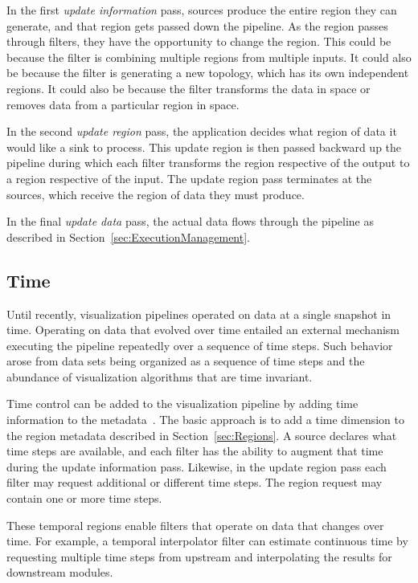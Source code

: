 \documentclass[journal,onecolumn,12pt,letterpaper,twoside]{IEEEtran}
\newcommand*{\lcite}[1]{~\cite{#1}}
\newcommand*{\keyterm}[1]{\emph{#1}}
\begin{document}
In the first \keyterm{update information} pass, sources produce the entire
region they can generate, and that region gets passed down the pipeline.
As the region passes through filters, they have the opportunity to change
the region.  This could be because the filter is combining multiple regions
from multiple inputs.  It could also be because the filter is generating a
new topology, which has its own independent regions.  It could also be
because the filter transforms the data in space or removes data from a
particular region in space.

In the second \keyterm{update region} pass, the application decides what
region of data it would like a sink to process.  This update region is then
passed backward up the pipeline during which each filter transforms the
region respective of the output to a region respective of the input.  The
update region pass terminates at the sources, which receive the region of
data they must produce.

In the final \keyterm{update data} pass, the actual data flows through the
pipeline as described in Section~\ref{sec:ExecutionManagement}.

\subsection{Time}
\label{sec:Time}

Until recently, visualization pipelines operated on data at a single
snapshot in time.  Operating on data that evolved over time entailed an
external mechanism executing the pipeline repeatedly over a sequence of
time steps.  Such behavior arose from data sets being organized as a
sequence of time steps and the abundance of visualization algorithms that
are time invariant.

Time control can be added to the visualization pipeline by adding time
information to the metadata\lcite{Biddiscombe2007}.  The basic approach is
to add a time dimension to the region metadata described in
Section~\ref{sec:Regions}.  A source declares what time steps are
available, and each filter has the ability to augment that time during the
update information pass.  Likewise, in the update region pass each filter
may request additional or different time steps.  The region request may contain
one or more time steps.

These temporal regions enable filters that operate on data that changes
over time.  For example, a temporal interpolator filter can estimate
continuous time by requesting multiple time steps from upstream and
interpolating the results for downstream modules.
\end{document}
